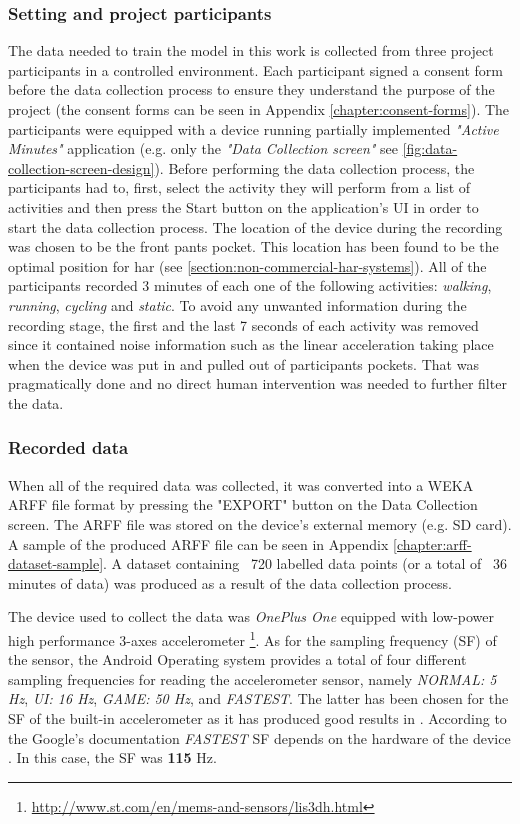     \subsubsection{Setting and project participants}
    The data needed to train the model in this work is collected from three project participants in a controlled environment. Each participant signed a consent form before the data collection process to ensure they understand the purpose of the project (the consent forms can be seen in Appendix \ref{chapter:consent-forms}). The participants were equipped with a device running partially implemented \textit{"Active Minutes"} application (e.g. only the \textit{"Data Collection screen"} see \ref{fig:data-collection-screen-design}). Before performing the data collection process, the participants had to, first, select the activity they will perform from a list of activities and then press the Start button on the application's UI in order to start the data collection process. The location of the device during the recording was chosen to be the front pants pocket. This location has been found to be the optimal position for \gls{har} (see \ref{section:non-commercial-har-systems}). All of the participants recorded 3 minutes of each one of the following activities: \textit{walking}, \textit{running}, \textit{cycling} and \textit{static}. To avoid any unwanted information during the recording stage, the first and the last 7 seconds of each activity was removed since it contained noise information such as the linear acceleration taking place when the device was put in and pulled out of participants pockets. That was pragmatically done and no direct human intervention was needed to further filter the data.
    
    \subsubsection{Recorded data}
    \label{subsubsection:recorded_data}
    When all of the required data was collected, it was converted into a WEKA ARFF file format by pressing the "EXPORT" button on the Data Collection screen. The ARFF file was stored on the device's external memory (e.g. SD card). A sample of the produced ARFF file can be seen in Appendix \ref{chapter:arff-dataset-sample}. A dataset containing ~720 labelled data points (or a total of ~36 minutes of data) was produced as a result of the data collection process. 
    
    The device used to collect the data was \textit{OnePlus One} equipped with low-power high performance 3-axes accelerometer \footnote{\url{http://www.st.com/en/mems-and-sensors/lis3dh.html}}. As for the sampling frequency (SF) of the sensor, the Android Operating system provides a total of four different sampling frequencies for reading the accelerometer sensor, namely \textit{NORMAL: 5 Hz}, \textit{UI: 16 Hz}, \textit{GAME: 50 Hz}, and \textit{FASTEST}. The latter has been chosen for the SF of the built-in accelerometer as it has produced good results in \citet[3-5]{lee2016}. According to the Google's documentation \textit{FASTEST} SF depends on the hardware of the device \citep{googlesensormanager2017}. In this case, the SF was \textbf{115} Hz. 
    
